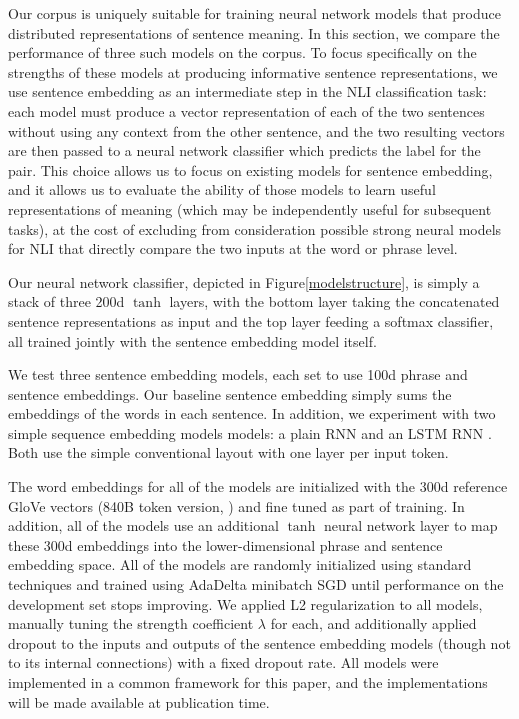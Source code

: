 Our corpus is uniquely suitable for training neural network models that produce distributed representations of sentence meaning. In this section, we compare the performance of three such models on the corpus. 
To focus specifically on the strengths of these models at producing informative sentence representations, we use sentence embedding as an intermediate step in the NLI classification task: each model must produce a vector representation of each of the two sentences without using any context from the other sentence, and the two resulting vectors are then passed to a neural network classifier which predicts the label for the pair. This choice allows us to focus on existing models for sentence embedding, and it allows us to evaluate the ability of those models to learn useful representations of meaning (which may be independently useful for subsequent tasks), at the cost of excluding from consideration possible strong neural models for NLI that directly compare the two inputs at the word or phrase level.



Our neural network classifier, depicted in Figure\ref{modelstructure}, is simply a stack of three 200d $\tanh$ layers, with the bottom layer taking the concatenated sentence representations as input and the top layer feeding a softmax classifier, all trained jointly with the sentence embedding model itself.

We test three sentence embedding models, each set to use 100d phrase and sentence embeddings. Our baseline sentence embedding simply sums the embeddings of the words in each sentence. In addition, we experiment with two simple sequence embedding models models: a plain RNN and an LSTM RNN \cite{hochreiter1997long}. Both use the simple conventional layout with one layer per input token.

The word embeddings for all of the models are initialized with the 300d reference GloVe vectors (840B token version, \citealt{pennington2014glove}) and fine tuned as part of training. In addition, all of the models use an additional $\tanh$ neural network layer to map these 300d embeddings into the lower-dimensional phrase and sentence embedding space. All of the models are randomly initialized using standard techniques and trained using AdaDelta \cite{zeiler2012adadelta} minibatch SGD until performance on the development set stops improving. We applied L2 regularization to all models, manually tuning the strength coefficient $\lambda$ for each, and additionally applied dropout \cite{srivastava2014dropout} to the inputs and outputs of the sentence embedding models (though not to its internal connections) with a fixed dropout rate. All models were implemented in a common framework for this paper, and the implementations will be made available at publication time.

